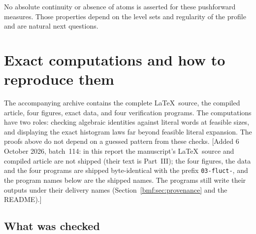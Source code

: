 \documentclass[11pt]{article}
\numberwithin{equation}{section}
\theoremstyle{definition}
\theoremstyle{remark}
\begin{document}
No absolute continuity or absence of atoms is asserted for these
pushforward measures. Those properties depend on the level sets
and regularity of the profile and are natural next questions.

\section{Exact computations and how to reproduce them}
\label{bmf:sec:computations}

The accompanying archive contains the complete \LaTeX\ source,
the compiled article, four figures, exact data, and four verification
programs. The computations have two roles: checking algebraic
identities against literal words at feasible sizes, and displaying
the exact histogram laws far beyond feasible literal expansion.
The proofs above do not depend on a guessed pattern from these checks.
[Added 6 October 2026, batch~114: in this report the manuscript's
\LaTeX\ source and compiled article are not shipped (their text is
Part~III); the four figures, the data and the four programs are shipped
byte-identical with the prefix \texttt{03-fluct-}, and the program names
below are the shipped names. The programs still write their outputs under
their delivery names (Section~\ref{bmf:sec:provenance} and the README).]

\subsection{What was checked}
\end{document}
